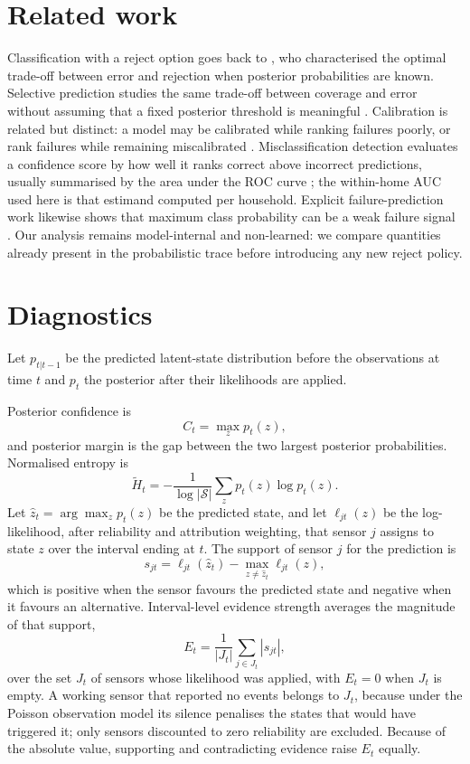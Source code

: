 \documentclass[11pt]{article}
\renewcommand{\_}{\textunderscore\allowbreak}
\begin{document}
\section{Related work}
Classification with a reject option goes back to \citet{chow1970reject}, who characterised the optimal trade-off between error and rejection when posterior probabilities are known. Selective prediction studies the same trade-off between coverage and error without assuming that a fixed posterior threshold is meaningful \citep{geifman2017selective,geifman2019selectivenet}. Calibration is related but distinct: a model may be calibrated while ranking failures poorly, or rank failures while remaining miscalibrated \citep{guo2017calibration}. Misclassification detection evaluates a confidence score by how well it ranks correct above incorrect predictions, usually summarised by the area under the ROC curve \citep{hendrycks2017baseline}; the within-home AUC used here is that estimand computed per household. Explicit failure-prediction work likewise shows that maximum class probability can be a weak failure signal \citep{corbiere2019failure}. Our analysis remains model-internal and non-learned: we compare quantities already present in the probabilistic trace before introducing any new reject policy.

\section{Diagnostics}
Let $p_{t|t-1}$ be the predicted latent-state distribution before the observations at time $t$ and $p_t$ the posterior after their likelihoods are applied.

Posterior confidence is
\[
C_t=\max_z p_t(z),
\]
and posterior margin is the gap between the two largest posterior probabilities. Normalised entropy is
\[
\widetilde H_t=-\frac{1}{\log|\mathcal S|}\sum_z p_t(z)\log p_t(z).
\]
Let $\hat z_t=\arg\max_z p_t(z)$ be the predicted state, and let $\ell_{jt}(z)$ be the log-likelihood, after reliability and attribution weighting, that sensor $j$ assigns to state $z$ over the interval ending at $t$. The support of sensor $j$ for the prediction is
\[
s_{jt}=\ell_{jt}(\hat z_t)-\max_{z\neq\hat z_t}\ell_{jt}(z),
\]
which is positive when the sensor favours the predicted state and negative when it favours an alternative. Interval-level evidence strength averages the magnitude of that support,
\[
E_t=\frac{1}{|J_t|}\sum_{j\in J_t}|s_{jt}|,
\]
over the set $J_t$ of sensors whose likelihood was applied, with $E_t=0$ when $J_t$ is empty. A working sensor that reported no events belongs to $J_t$, because under the Poisson observation model its silence penalises the states that would have triggered it; only sensors discounted to zero reliability are excluded. Because of the absolute value, supporting and contradicting evidence raise $E_t$ equally.
\end{document}
